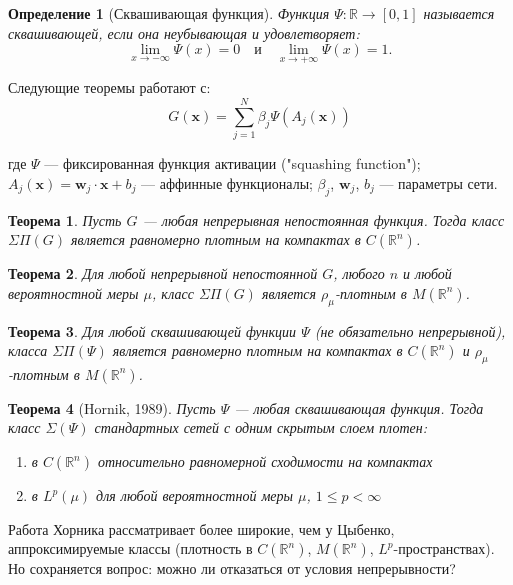 \documentclass[12pt]{article}
\newtheorem{theorem}{Теорема}
\newtheorem{definition}{Определение}
\begin{document}
	\begin{definition}[Сквашивающая функция]
		Функция $\Psi: \mathbb{R} \to [0,1]$ называется сквашивающей, если она неубывающая и удовлетворяет:
		\[
		\lim_{x \to -\infty} \Psi(x) = 0 \quad \text{и} \quad \lim_{x \to +\infty} \Psi(x) = 1.
		\]
	\end{definition}
	
	Следующие теоремы работают с:
	\begin{equation}
		G(\mathbf{x}) = \sum_{j=1}^{N} \beta_j \Psi(A_j(\mathbf{x}))
	\end{equation}
	
	где $\Psi$ — фиксированная функция активации ("squashing function"); 
	$A_j(\mathbf{x}) = \mathbf{w}_j \cdot \mathbf{x} + b_j$ — аффинные функционалы;
	$\beta_j$, $\mathbf{w}_j$, $b_j$ — параметры сети.
	\begin{theorem}
		Пусть $G$ — любая непрерывная непостоянная функция. Тогда класс $\Sigma\Pi(G)$ является равномерно плотным на компактах в $C(\mathbb{R}^n)$.
	\end{theorem}
	
	\begin{theorem}
		Для любой непрерывной непостоянной $G$, любого $n$ и любой вероятностной меры $\mu$, класс $\Sigma\Pi(G)$ является $\rho_\mu$-плотным в $M(\mathbb{R}^n)$.
	\end{theorem}
	
	\begin{theorem}
		Для любой сквашивающей функции $\Psi$ (не обязательно непрерывной), класса $\Sigma\Pi(\Psi)$ является равномерно плотным на компактах в $C(\mathbb{R}^n)$ и $\rho_\mu$-плотным в $M(\mathbb{R}^n)$.
	\end{theorem}
	
	\begin{theorem}[Hornik, 1989]
		Пусть $\Psi$ --- любая сквашивающая функция. Тогда класс $\Sigma(\Psi)$ стандартных сетей с одним скрытым слоем плотен:
		\begin{enumerate}
			\item в $C(\mathbb{R}^n)$ относительно равномерной сходимости на компактах
			\item в $L^p(\mu)$ для любой вероятностной меры $\mu$, $1 \leq p < \infty$
		\end{enumerate}
	\end{theorem}
	
	Работа Хорника рассматривает более широкие, чем у Цыбенко, аппроксимируемые классы (плотность в $C(\mathbb{R}^n)$, $M(\mathbb{R}^n)$, $L^p$-пространствах). Но сохраняется вопрос: можно ли отказаться от условия непрерывности?
	
\end{document}

